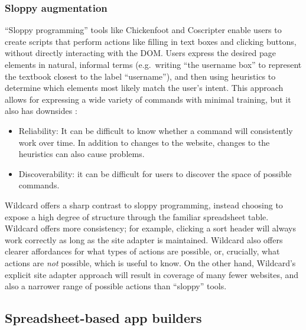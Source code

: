 \documentclass[english,submission]{programming}
\providecommand{\tightlist}{%
  \setlength{\itemsep}{0pt}\setlength{\parskip}{0pt}}
\begin{document}
\hypertarget{sloppy-augmentation}{%
\subsubsection{Sloppy augmentation}\label{sloppy-augmentation}}

``Sloppy programming'' \autocite{little2010} tools like Chickenfoot
\autocite{bolin2005} and Coscripter \autocite{leshed2008} enable users
to create scripts that perform actions like filling in text boxes and
clicking buttons, without directly interacting with the DOM. Users
express the desired page elements in natural, informal terms
(e.g.~writing ``the username box'' to represent the textbook closest to
the label ``username''), and then using heuristics to determine which
elements most likely match the user's intent. This approach allows for
expressing a wide variety of commands with minimal training, but it also
has downsides \autocite{little2010}:

\begin{itemize}
\tightlist
\item
  Reliability: It can be difficult to know whether a command will
  consistently work over time. In addition to changes to the website,
  changes to the heuristics can also cause problems.
\item
  Discoverability: it can be difficult for users to discover the space
  of possible commands.
\end{itemize}

Wildcard offers a sharp contrast to sloppy programming, instead choosing
to expose a high degree of structure through the familiar spreadsheet
table. Wildcard offers more consistency; for example, clicking a sort
header will always work correctly as long as the site adapter is
maintained. Wildcard also offers clearer affordances for what types of
actions are possible, or, crucially, what actions are \emph{not}
possible, which is useful to know. On the other hand, Wildcard's
explicit site adapter approach will result in coverage of many fewer
websites, and also a narrower range of possible actions than ``sloppy''
tools.

\hypertarget{spreadsheet-based-app-builders}{%
\subsection{Spreadsheet-based app
builders}\label{spreadsheet-based-app-builders}}
\end{document}
